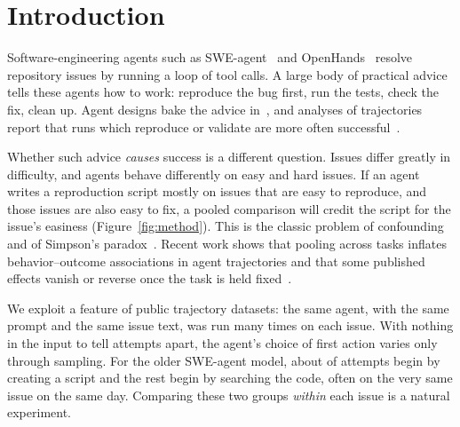 \documentclass[sigconf,review=false,anonymous=false]{acmart}
\begin{document}
\section{Introduction}

Software-engineering agents such as SWE-agent~\cite{yang2024sweagent} and OpenHands~\cite{wang2025openhands} resolve repository issues by running a loop of tool calls. A large body of practical advice tells these agents how to work: reproduce the bug first, run the tests, check the fix, clean up. Agent designs bake the advice in~\cite{chen2024coder}, and analyses of trajectories report that runs which reproduce or validate are more often successful~\cite{zan2025multiswebench,mehtiyev2026beyond}.

Whether such advice \emph{causes} success is a different question. Issues differ greatly in difficulty, and agents behave differently on easy and hard issues. If an agent writes a reproduction script mostly on issues that are easy to reproduce, and those issues are also easy to fix, a pooled comparison will credit the script for the issue's easiness (Figure~\ref{fig:method}). This is the classic problem of confounding and of Simpson's paradox~\cite{simpson1951}. Recent work shows that pooling across tasks inflates behavior--outcome associations in agent trajectories and that some published effects vanish or reverse once the task is held fixed~\cite{khanna2026sametask}.

We exploit a feature of public trajectory datasets: the same agent, with the same prompt and the same issue text, was run many times on each issue. With nothing in the input to tell attempts apart, the agent's choice of first action varies only through sampling. For the older SWE-agent model, about \OlderShareR{} of attempts begin by creating a script and the rest begin by searching the code, often on the very same issue on the same day. Comparing these two groups \emph{within} each issue is a natural experiment.
\end{document}
